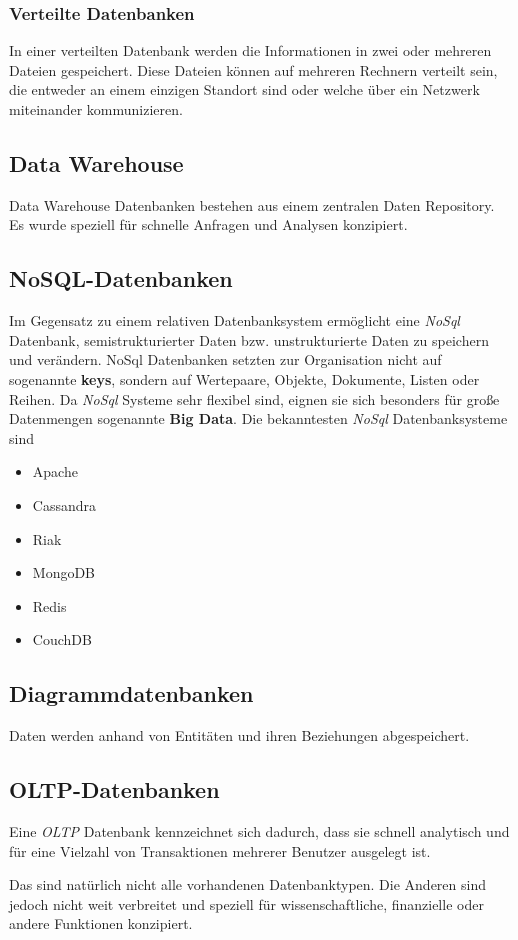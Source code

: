 \subsubsection{Verteilte Datenbanken}
In einer verteilten Datenbank werden die Informationen in zwei oder mehreren Dateien gespeichert.
Diese Dateien können auf mehreren Rechnern verteilt sein, die entweder an einem einzigen Standort
sind oder welche über ein Netzwerk miteinander kommunizieren.

\subsection{Data Warehouse}
Data Warehouse Datenbanken bestehen aus einem zentralen Daten Repository. Es wurde speziell für
schnelle Anfragen und Analysen konzipiert.

\subsection{NoSQL-Datenbanken}
Im Gegensatz zu einem relativen Datenbanksystem ermöglicht eine \textit{NoSql} Datenbank,
semistrukturierter Daten bzw. unstrukturierte Daten zu speichern und verändern. NoSql Datenbanken
setzten zur Organisation nicht auf sogenannte \textbf{keys}, sondern auf Wertepaare, Objekte, Dokumente,
Listen oder Reihen. Da \textit{NoSql} Systeme sehr flexibel sind, eignen sie sich
besonders für große Datenmengen sogenannte \textbf{Big Data}. Die bekanntesten
\textit{NoSql} Datenbanksysteme sind
\begin{itemize}
    \item Apache
    \item Cassandra
    \item Riak
    \item MongoDB
    \item Redis
    \item CouchDB
\end{itemize}

\subsection{Diagrammdatenbanken}
Daten werden anhand von Entitäten und ihren Beziehungen abgespeichert.

\subsection{OLTP-Datenbanken}
Eine \textit{OLTP} Datenbank kennzeichnet sich dadurch, dass sie schnell analytisch und für eine
Vielzahl von Transaktionen mehrerer Benutzer ausgelegt ist.

Das sind natürlich nicht alle vorhandenen Datenbanktypen. Die Anderen sind jedoch
nicht weit verbreitet und speziell für wissenschaftliche, finanzielle oder andere Funktionen konzipiert.


\cite{MySQL}
\label{db}

